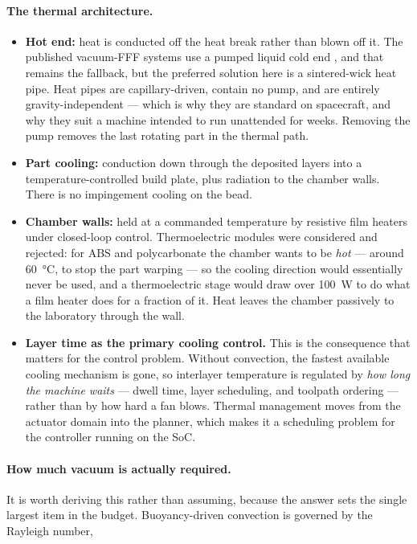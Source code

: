 \documentclass[11pt,a4paper]{article}
\begin{document}
\paragraph{The thermal architecture.}
\begin{itemize}
  \item \textbf{Hot end:} heat is conducted off the heat break rather than blown
        off it. The published vacuum-FFF systems use a pumped liquid cold end
        \cite{scirep2025vacuumfff,peek_vacuum2025}, and that remains the
        fallback, but the preferred solution here is a sintered-wick heat pipe.
        Heat pipes are capillary-driven, contain no pump, and are entirely
        gravity-independent --- which is why they are standard on spacecraft, and
        why they suit a machine intended to run unattended for weeks. Removing
        the pump removes the last rotating part in the thermal path.
  \item \textbf{Part cooling:} conduction down through the deposited layers into
        a temperature-controlled build plate, plus radiation to the chamber
        walls. There is no impingement cooling on the bead.
  \item \textbf{Chamber walls:} held at a commanded temperature by resistive
        film heaters under closed-loop control. Thermoelectric modules were
        considered and rejected: for ABS and polycarbonate the chamber wants to
        be \emph{hot} --- around \SI{60}{\celsius}, to stop the part warping ---
        so the cooling direction would essentially never be used, and a
        thermoelectric stage would draw over \SI{100}{\watt} to do what a film
        heater does for a fraction of it. Heat leaves the chamber passively to
        the laboratory through the wall.
  \item \textbf{Layer time as the primary cooling control.} This is the
        consequence that matters for the control problem. Without convection,
        the fastest available cooling mechanism is gone, so interlayer
        temperature is regulated by \emph{how long the machine waits} --- dwell
        time, layer scheduling, and toolpath ordering --- rather than by how hard
        a fan blows. Thermal management moves from the actuator domain into the
        planner, which makes it a scheduling problem for the controller running
        on the SoC.
\end{itemize}

\paragraph{How much vacuum is actually required.} It is worth deriving this
rather than assuming, because the answer sets the single largest item in the
budget. Buoyancy-driven convection is governed by the Rayleigh number,
\end{document}
